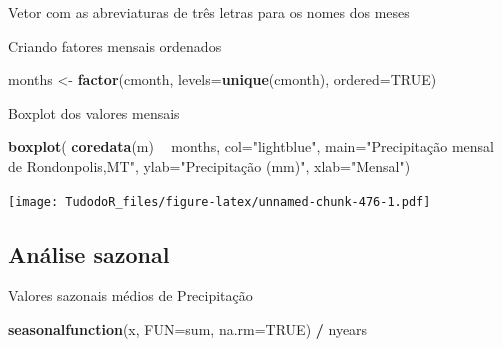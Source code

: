 \documentclass[
]{book}
\newenvironment{Shaded}{\begin{snugshade}}{\end{snugshade}}
\newcommand{\DataTypeTok}[1]{\textcolor[rgb]{0.13,0.29,0.53}{#1}}
\newcommand{\KeywordTok}[1]{\textcolor[rgb]{0.13,0.29,0.53}{\textbf{#1}}}
\newcommand{\NormalTok}[1]{#1}
\newcommand{\OperatorTok}[1]{\textcolor[rgb]{0.81,0.36,0.00}{\textbf{#1}}}
\newcommand{\OtherTok}[1]{\textcolor[rgb]{0.56,0.35,0.01}{#1}}
\newcommand{\StringTok}[1]{\textcolor[rgb]{0.31,0.60,0.02}{#1}}
\begin{document}
Vetor com as abreviaturas de três letras para os nomes dos meses

\begin{Shaded}
\end{Shaded}

Criando fatores mensais ordenados

\begin{Shaded}
\begin{Highlighting}[]
\NormalTok{months <-}\StringTok{ }\KeywordTok{factor}\NormalTok{(cmonth, }\DataTypeTok{levels=}\KeywordTok{unique}\NormalTok{(cmonth), }\DataTypeTok{ordered=}\OtherTok{TRUE}\NormalTok{)}
\end{Highlighting}
\end{Shaded}

Boxplot dos valores mensais

\begin{Shaded}
\begin{Highlighting}[]
\KeywordTok{boxplot}\NormalTok{( }\KeywordTok{coredata}\NormalTok{(m) }\OperatorTok{~}\StringTok{ }\NormalTok{months, }
         \DataTypeTok{col=}\StringTok{"lightblue"}\NormalTok{, }
         \DataTypeTok{main=}\StringTok{"Precipitação mensal de Rondonpolis,MT"}\NormalTok{,}
        \DataTypeTok{ylab=}\StringTok{"Precipitação (mm)"}\NormalTok{, }\DataTypeTok{xlab=}\StringTok{"Mensal"}\NormalTok{)}
\end{Highlighting}
\end{Shaded}

\texttt{[image: TudodoR\_files/figure-latex/unnamed-chunk-476-1.pdf]}

\hypertarget{anuxe1lise-sazonal}{%
\subsection{Análise sazonal}\label{anuxe1lise-sazonal}}

Valores sazonais médios de Precipitação

\begin{Shaded}
\begin{Highlighting}[]
\KeywordTok{seasonalfunction}\NormalTok{(x, }\DataTypeTok{FUN=}\NormalTok{sum, }\DataTypeTok{na.rm=}\OtherTok{TRUE}\NormalTok{) }\OperatorTok{/}\StringTok{ }\NormalTok{nyears}
\end{Highlighting}
\end{Shaded}
\end{document}
